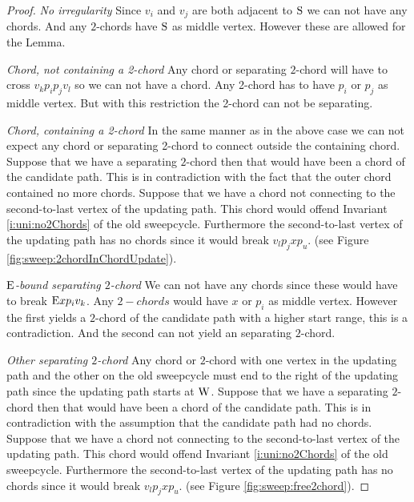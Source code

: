     \begin{proof}
      \emph{No irregularity}
      Since $v_i$ and $v_j$ are both adjacent to $\mathrm{S}$ we can not have any chords. And any $2$-chords have $\mathrm{S}$ as middle vertex. However these are allowed for the Lemma.

      \emph{Chord, not containing a 2-chord}
      Any chord or separating $2$-chord will have to cross $v_k p_i p_j v_l$ so we can not have a chord. Any 2-chord has to have $p_i$ or $p_j$ as middle vertex. But with this restriction the 2-chord can not be separating.

      \emph{Chord, containing a 2-chord}
      In the same manner as in the above case we can not expect any chord or separating 2-chord to connect outside the containing chord.
      Suppose that we have a separating $2$-chord then that would have been a chord of the candidate path. This is in contradiction with the fact that the outer chord contained no more chords.
      Suppose that we have a chord not connecting to the second-to-last vertex of the updating path. This chord would offend Invariant \ref{i:uni:no2Chords} of the old sweepcycle. Furthermore the second-to-last vertex of the updating path has no chords since it would break $v_l p_j x p_u$. (see Figure \ref{fig:sweep:2chordInChordUpdate}).

      \emph{$\mathrm{E}$-bound separating $2$-chord}
      We can not have any chords since these would have to break $\mathrm{E} x p_i v_k$. Any $2-chords$ would have $x$ or $p_i$ as middle vertex. However the first yields a $2$-chord of the candidate path with a higher start range, this is a contradiction. And the second can not yield an separating $2$-chord.


      \emph{Other separating $2$-chord}
      Any chord or $2$-chord with one vertex in the updating path and the other on the old sweepcycle must end to the right of the updating path since the updating path starts at $\mathrm{W}$.
      Suppose that we have a separating $2$-chord then that would have been a chord of the candidate path. This is in contradiction with the assumption that the candidate path had no chords.
      Suppose that we have a chord not connecting to the second-to-last vertex of the updating path. This chord would offend Invariant \ref{i:uni:no2Chords} of the old sweepcycle. Furthermore the second-to-last vertex of the updating path has no chords since it would break $v_l p_j x p_u$. (see Figure \ref{fig:sweep:free2chord}).
    \end{proof}


